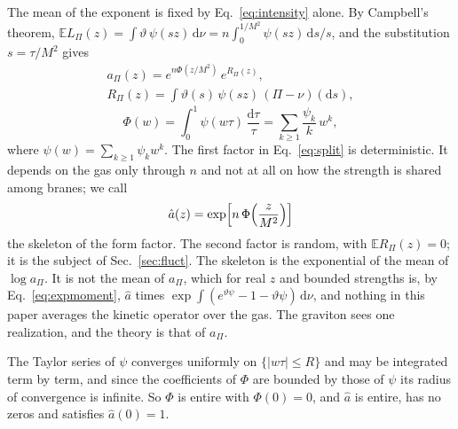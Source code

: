 \documentclass[aps,prd,10pt,twocolumn,superscriptaddress,nofootinbib,floatfix,longbibliography]{revtex4-2}
\newcommand{\bE}{\mathbb{E}}
\newcommand{\dd}{\mathrm{d}}
\begin{document}
The mean of the exponent is fixed by Eq.~\eqref{eq:intensity} alone. By Campbell's theorem, $\bE L_\Pi(z)=\int\vartheta\,\psi(sz)\,\dd\nu=n\int_0^{1/M^2}\psi(sz)\,\dd s/s$, and the substitution $s=\tau/M^2$ gives
\begin{equation}
\label{eq:split}
\begin{gathered}
a_\Pi(z)=e^{n\Phi(z/M^2)}\,e^{R_\Pi(z)},\\
R_\Pi(z)=\int\vartheta(s)\,\psi(sz)\,(\Pi-\nu)(\dd s),
\end{gathered}
\end{equation}
\begin{equation}
\label{eq:Phi}
\Phi(w)=\int_0^1\psi(w\tau)\,\frac{\dd\tau}{\tau}=\sum_{k\ge1}\frac{\psi_k}{k}\,w^k ,
\end{equation}
where $\psi(w)=\sum_{k\ge1}\psi_kw^k$. The first factor in Eq.~\eqref{eq:split} is deterministic. It depends on the gas only through $n$ and not at all on how the strength is shared among branes; we call
\begin{equation}
\label{eq:avg}
\hat a(z)=\exp\Bigl[n\,\Phi\Bigl(\frac z{M^2}\Bigr)\Bigr]
\end{equation}
the skeleton of the form factor. The second factor is random, with $\bE R_\Pi(z)=0$; it is the subject of Sec.~\ref{sec:fluct}. The skeleton is the exponential of the mean of $\log a_\Pi$. It is not the mean of $a_\Pi$, which for real $z$ and bounded strengths is, by Eq.~\eqref{eq:expmoment}, $\hat a$ times $\exp\int(e^{\vartheta\psi}-1-\vartheta\psi)\,\dd\nu$, and nothing in this paper averages the kinetic operator over the gas. The graviton sees one realization, and the theory is that of $a_\Pi$.

The Taylor series of $\psi$ converges uniformly on $\{|w\tau|\le R\}$ and may be integrated term by term, and since the coefficients of $\Phi$ are bounded by those of $\psi$ its radius of convergence is infinite. So $\Phi$ is entire with $\Phi(0)=0$, and $\hat a$ is entire, has no zeros and satisfies $\hat a(0)=1$.
\end{document}
